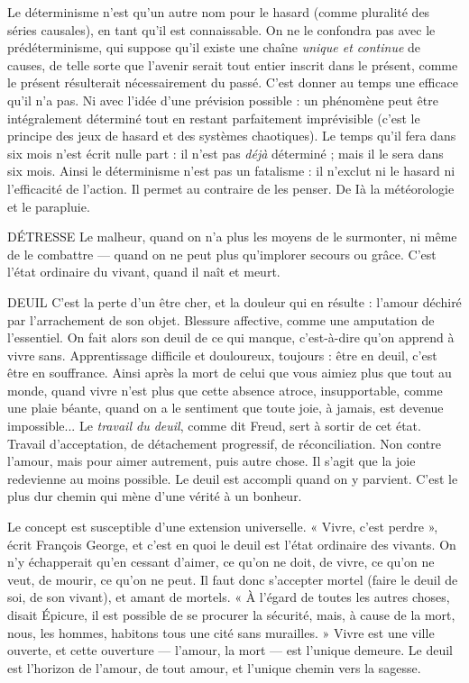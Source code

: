 Le déterminisme n’est qu’un autre nom pour le hasard (comme pluralité
des séries causales), en tant qu’il est connaissable. On ne le confondra pas avec
le prédéterminisme, qui suppose qu’il existe une chaîne {\it unique et continue} de
causes, de telle sorte que l'avenir serait tout entier inscrit dans le présent,
comme le présent résulterait nécessairement du passé. C’est donner au temps
une efficace qu’il n’a pas. Ni avec l’idée d’une prévision possible : un phénomène
peut être intégralement déterminé tout en restant parfaitement imprévisible
(c’est le principe des jeux de hasard et des systèmes chaotiques). Le temps
qu'il fera dans six mois n’est écrit nulle part : il n’est pas {\it déjà} déterminé ; mais
il le sera dans six mois. Ainsi le déterminisme n’est pas un fatalisme : il n’exclut
ni le hasard ni l'efficacité de l’action. Il permet au contraire de les penser. De Ià
la météorologie et le parapluie.

DÉTRESSE Le malheur, quand on n’a plus les moyens de le surmonter, ni
même de le combattre — quand on ne peut plus qu’implorer
secours ou grâce. C’est l’état ordinaire du vivant, quand il naît et meurt.

DEUIL C'est la perte d’un être cher, et la douleur qui en résulte : l'amour
déchiré par l’arrachement de son objet. Blessure affective, comme
une amputation de l'essentiel. On fait alors son deuil de ce qui manque, c’est-à-dire
qu’on apprend à vivre sans. Apprentissage difficile et douloureux, toujours :
être en deuil, c’est être en souffrance. Ainsi après la mort de celui que vous aimiez
plus que tout au monde, quand vivre n’est plus que cette absence atroce, insupportable,
comme une plaie béante, quand on a le sentiment que toute joie, à
jamais, est devenue impossible... Le {\it travail du deuil}, comme dit Freud, sert à
sortir de cet état. Travail d’acceptation, de détachement progressif, de réconciliation.
Non contre l'amour, mais pour aimer autrement, puis autre chose. Il s’agit
que la joie redevienne au moins possible. Le deuil est accompli quand on y parvient.
C’est le plus dur chemin qui mène d’une vérité à un bonheur.

Le concept est susceptible d’une extension universelle. « Vivre, c’est
perdre », écrit François George, et c’est en quoi le deuil est l’état ordinaire des
vivants. On n’y échapperait qu’en cessant d’aimer, ce qu’on ne doit, de vivre,
ce qu'on ne veut, de mourir, ce qu’on ne peut. Il faut donc s’accepter mortel
(faire le deuil de soi, de son vivant), et amant de mortels. « À l'égard de toutes
les autres choses, disait Épicure, il est possible de se procurer la sécurité, mais,
à cause de la mort, nous, les hommes, habitons tous une cité sans murailles. »
Vivre est une ville ouverte, et cette ouverture — l’amour, la mort — est l’unique
demeure. Le deuil est l'horizon de l'amour, de tout amour, et l'unique chemin
vers la sagesse.

